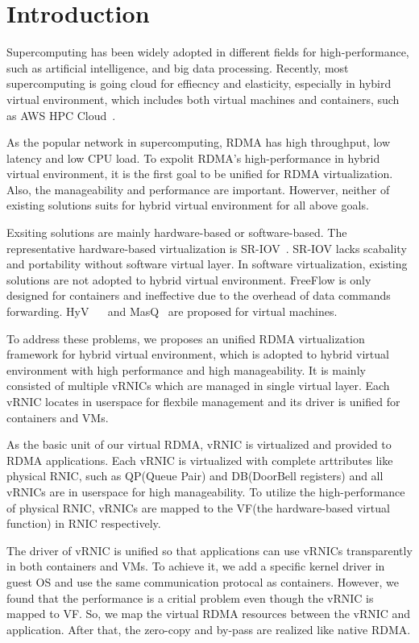 \section{Introduction}
 Supercomputing has been widely adopted in different fields for high-performance, such as artificial intelligence, and big data processing. Recently, most supercomputing is going cloud for effiecncy and elasticity, especially in hybird virtual environment, which includes both virtual machines and containers, such as AWS HPC Cloud~\cite{aws-hpc}. 

As the popular network in supercomputing, RDMA has high throughput, low latency and low CPU load. To expolit RDMA's high-performance in hybrid virtual environment, it is the first goal to be unified for RDMA virtualization. Also, the manageability and performance are important. Howerver, neither of existing solutions suits for hybrid virtual environment for all above goals.

Exsiting solutions are mainly hardware-based or software-based. The representative hardware-based virtualization is SR-IOV~\cite{sr-iov}. SR-IOV lacks scabality and portability without software virtual layer. In software virtualization, existing solutions are not adopted to hybrid virtual environment. FreeFlow is only designed for containers and ineffective due to the overhead of data commands forwarding.  HyV~\cite{pfefferle2015hybrid} ~\cite{pfefferle2014vverbs} and MasQ~\cite{he2020masq} are proposed for virtual machines.

To address these problems, we proposes an unified RDMA virtualization framework for hybrid virtual environment, which is adopted to hybrid virtual environment with high performance and high manageability. It is mainly consisted of multiple vRNICs which are managed in single virtual layer. Each vRNIC locates in userspace for flexbile management and its driver is unified for containers and VMs.

As the basic unit of our virtual RDMA, vRNIC is virtualized and provided to RDMA applications. Each vRNIC is virtualized with complete arttributes like physical RNIC, such as QP(Queue Pair) and DB(DoorBell registers) and all vRNICs are in userspace for high manageability. To utilize the high-performance of physical RNIC, vRNICs are mapped to the VF(the hardware-based virtual function) in RNIC respectively. 

The driver of vRNIC is unified so that applications can use vRNICs transparently in both containers and VMs. To achieve it, we add a specific kernel driver in guest OS and use the same communication protocal as containers. However, we found that the performance is a critial problem even though the vRNIC is mapped to VF. So, we map the virtual RDMA resources between the vRNIC and application. After that, the zero-copy and by-pass are realized like native RDMA.

